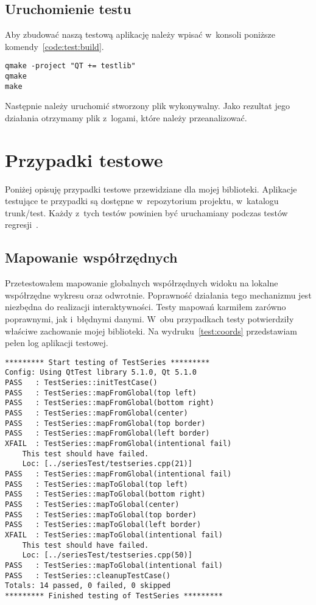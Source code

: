 \subsection{Uruchomienie testu}
Aby zbudować naszą testową aplikację należy wpisać w~konsoli poniższe komendy~\ref{code:test:build}.
\begin{lstlisting}[caption=Budowanie aplikacji testowej, label=code:test:build]
qmake -project "QT += testlib"
qmake
make
\end{lstlisting}

Następnie należy uruchomić stworzony plik wykonywalny. Jako rezultat jego działania otrzymamy plik z~logami, które należy przeanalizować.

\section{Przypadki testowe}
Poniżej opisuję przypadki testowe przewidziane dla mojej biblioteki. Aplikacje testujące te przypadki są dostępne w~repozytorium projektu, w~katalogu trunk/test. Każdy z~tych testów powinien być uruchamiany podczas testów regresji~\cite{Sacha}.

\subsection{Mapowanie współrzędnych}
Przetestowałem mapowanie globalnych współrzędnych widoku na lokalne współrzędne wykresu oraz odwrotnie. Poprawność działania tego mechanizmu jest niezbędna do realizacji interaktywności. Testy mapowań karmiłem zarówno poprawnymi, jak i~błędnymi danymi. W~obu przypadkach testy potwierdziły właściwe zachowanie mojej biblioteki. Na wydruku~\ref{test:coords} przedstawiam pełen log aplikacji testowej.


\begin{lstlisting}[caption=Test mapowania współrzędnych, label=test:coords]
********* Start testing of TestSeries *********
Config: Using QtTest library 5.1.0, Qt 5.1.0
PASS   : TestSeries::initTestCase()
PASS   : TestSeries::mapFromGlobal(top left)
PASS   : TestSeries::mapFromGlobal(bottom right)
PASS   : TestSeries::mapFromGlobal(center)
PASS   : TestSeries::mapFromGlobal(top border)
PASS   : TestSeries::mapFromGlobal(left border)
XFAIL  : TestSeries::mapFromGlobal(intentional fail) 
	This test should have failed.
	Loc: [../seriesTest/testseries.cpp(21)]
PASS   : TestSeries::mapFromGlobal(intentional fail)
PASS   : TestSeries::mapToGlobal(top left)
PASS   : TestSeries::mapToGlobal(bottom right)
PASS   : TestSeries::mapToGlobal(center)
PASS   : TestSeries::mapToGlobal(top border)
PASS   : TestSeries::mapToGlobal(left border)
XFAIL  : TestSeries::mapToGlobal(intentional fail) 
	This test should have failed.
	Loc: [../seriesTest/testseries.cpp(50)]
PASS   : TestSeries::mapToGlobal(intentional fail)
PASS   : TestSeries::cleanupTestCase()
Totals: 14 passed, 0 failed, 0 skipped
********* Finished testing of TestSeries *********
\end{lstlisting}

